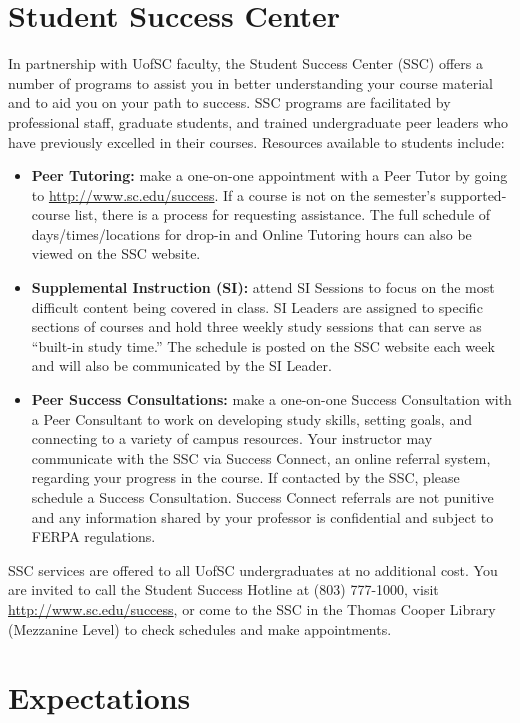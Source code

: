 \documentclass[10pt]{amsart}
\begin{document}
\section*{Student Success Center}
\noindent
In partnership with UofSC faculty, the Student Success Center (SSC) offers a number of programs to assist you in better understanding your course material and to aid you on your path to success. 
SSC programs are facilitated by professional staff, graduate students, and trained undergraduate peer leaders who have previously excelled in their courses.
Resources available to students include: 
\begin{itemize}
\item 
  \textbf{Peer Tutoring:} make a one-on-one appointment with a Peer Tutor by going to \url{http://www.sc.edu/success}. 
  If a course is not on the semester’s supported-course list, there is a process for requesting assistance. 
  The full schedule of days/times/locations for drop-in and Online Tutoring hours can also be viewed on the SSC website.
\item
  \textbf{Supplemental Instruction (SI):} attend SI Sessions to focus on the most difficult content being covered in class. 
  SI Leaders are assigned to specific sections of courses and hold three weekly study sessions that can serve as “built-in study time.” 
  The schedule is posted on the SSC website each week and will also be communicated by the SI Leader.
\item
  \textbf{Peer Success Consultations:} make a one-on-one Success Consultation with a Peer Consultant to work on developing study skills, setting goals, and connecting to a variety of campus resources. 
  Your instructor may communicate with the SSC via Success Connect, an online referral system, regarding your progress in the course. 
  If contacted by the SSC, please schedule a Success Consultation. 
  Success Connect referrals are not punitive and any information shared by your professor is confidential and subject to FERPA regulations.
\end{itemize}
SSC services are offered to all UofSC undergraduates at no additional cost.
You are invited to call the Student Success Hotline at (803) 777-1000, visit \url{http://www.sc.edu/success}, or come to the SSC in the Thomas Cooper Library (Mezzanine Level) to check schedules and make appointments. 

\newpage

\section*{Expectations}
\noindent
\end{document}
